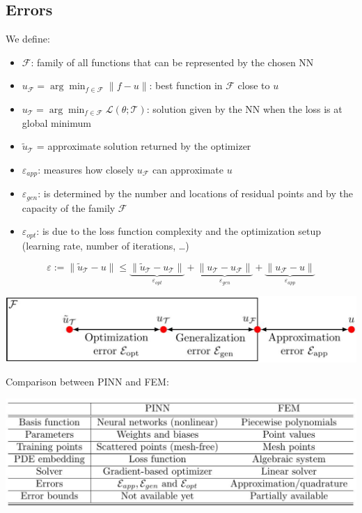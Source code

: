 \subsection*{Errors}
We define:
\begin{itemize}
    \item $\mathcal{F}$: family of all functions that can be represented by the chosen NN
    \item $u_{\mathcal{F}} = \arg \min_{f \in \mathcal{F}} \|f-u\|$: best function in $\mathcal{F}$ close to $u$
    \item $u_{\mathcal{T}} = \arg \min_{f \in \mathcal{F}} \mathcal{L}(\theta; \mathcal{T})$: solution given by the NN when the loss is at global minimum
    \item $\tilde{u}_{\mathcal{T}}$ = approximate solution returned by the optimizer
    \item $\varepsilon_{app}$: measures how closely $u_{\mathcal{F}}$ can approximate $u$
    \item $\varepsilon_{gen}$: is determined by the number and locations of residual points and by the capacity of the family $\mathcal{F}$
    \item $\varepsilon_{opt}$: is due to the loss function complexity and the optimization setup (learning rate, number of iterations, \dots)
\end{itemize}

\[
    \varepsilon := \|\tilde{u}_{\mathcal{T}} - u\| \leq \underbrace{\|\tilde{u}_{\mathcal{T}} - u_{\mathcal{T}}\|}_{\varepsilon_{opt}} + \underbrace{\|u_{\mathcal{T}} - u_{\mathcal{F}}\|}_{\varepsilon_{gen}} + \underbrace{\|u_{\mathcal{F}} - u\|}_{\varepsilon_{app}}    
\]
\begin{center}
    \includegraphics[scale=0.3]{../images/PINN_Error.png}
\end{center}
Comparison between PINN and FEM:
\begin{center}
    \includegraphics[scale=0.3]{../images/PINN_FEM_Comparison.png}
\end{center}

